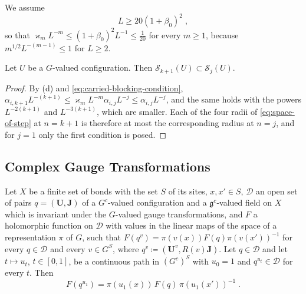 We assume
\begin{equation}\label{eq:carried-blocking-condition}
    L \geq 20(1 + \beta_0)^2\;,
\end{equation}
so that $\varkappa_mL^{-m} \leq (1 + \beta_0)^2L^{-1} \leq \frac{1}{20}$ for every $m \geq 1$, because $m^{1/2}L^{-(m-1)} \leq 1$ for $L \geq 2$.

\begin{lemma}\label{lem:space-inclusion}
Let $U$ be a $G$-valued configuration. Then $\mathcal S_{k+1}(U) \subset \mathcal S_j(U)$.
\end{lemma}

\begin{proof}
By (d) and \eqref{eq:carried-blocking-condition}, $\alpha_{i,k+1}L^{-(k+1)} \leq \varkappa_mL^{-m}\alpha_{i,j}L^{-j} \leq \alpha_{i,j}L^{-j}$, and the same holds with the powers $L^{-2(k+1)}$ and $L^{-3(k+1)}$, which are smaller. Each of the four radii of \eqref{eq:space-of-step} at $n = k + 1$ is therefore at most the corresponding radius at $n = j$, and for $j = 1$ only the first condition is posed.
\end{proof}

\subsection{Complex Gauge Transformations}\label{sec:complex-gauge}

\begin{lemma}\label{lem:complexified-covariance}
Let $X$ be a finite set of bonds with the set $S$ of its sites, $x, x' \in S$, $\mathcal D$ an open set of pairs $q = (\mathbf U, \mathbf J)$ of a $G^c$-valued configuration and a $\mathfrak g^c$-valued field on $X$ which is invariant under the $G$-valued gauge transformations, and $F$ a holomorphic function on $\mathcal D$ with values in the linear maps of the space of a representation $\pi$ of $G$, such that $F(q^v) = \pi(v(x))F(q)\pi(v(x'))^{-1}$ for every $q \in \mathcal D$ and every $v \in G^S$, where $q^v \coloneqq (\mathbf U^v, R(v)\mathbf J)$. Let $q \in \mathcal D$ and let $t \mapsto u_t$, $t \in [0, 1]$, be a continuous path in $(G^c)^S$ with $u_0 = 1$ and $q^{u_t} \in \mathcal D$ for every $t$. Then
\begin{equation}\label{eq:complexified-covariance}
    F(q^{u_1}) = \pi(u_1(x))\,F(q)\,\pi(u_1(x'))^{-1}\;.
\end{equation}
\end{lemma}

